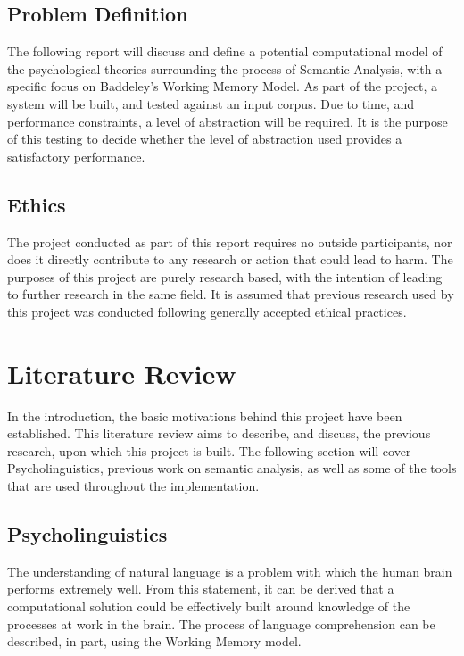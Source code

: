 \documentclass[]{article}
\begin{document}
\subsection{Problem Definition}
\label{sec:IntroProbDef}

The following report will discuss and define a potential computational model of the psychological theories surrounding the process of Semantic Analysis, with a specific focus on Baddeley's Working Memory Model. As part of the project, a system will be built, and tested against an input corpus. Due to time, and performance constraints, a level of abstraction will be required. It is the purpose of this testing to decide whether the level of abstraction used provides a satisfactory performance.

\subsection{Ethics}
\label{sec:IntroEthics}

The project conducted as part of this report requires no outside participants, nor does it directly contribute to any research or action that could lead to harm. The purposes of this project are purely research based, with the intention of leading to further research in the same field. It is assumed that previous research used by this project was conducted following generally accepted ethical practices.

\section{Literature Review}
\label{sec:LitReview}

In the introduction, the basic motivations behind this project have been established. This literature review aims to describe, and discuss, the previous research, upon which this project is built. The following section will cover Psycholinguistics, previous work on semantic analysis, as well as some of the tools that are used throughout the implementation.

\subsection{Psycholinguistics}
\label{sec:Psycholinguistics}
The understanding of natural language is a problem with which the human brain performs extremely well. From this statement, it can be derived that a computational solution could be effectively built around knowledge of the processes at work in the brain. The process of language comprehension can be described, in part, using the Working Memory model\cite{MemoryBaddeleyEysenkAnderson}.
\end{document}
